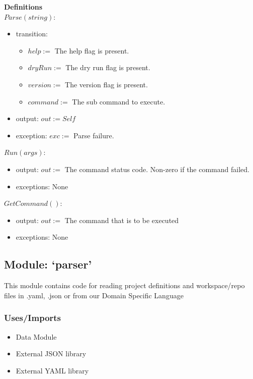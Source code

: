 \documentclass[11pt]{article}
\begin{document}
\vspace{2em}

\textbf{Definitions}\\

$Parse(string):$
\begin{itemize}
\item transition:
  \begin{itemize}
  \item $help :=$ The help flag is present.
  \item $dryRun :=$ The dry run flag is present.
  \item $version :=$ The version flag is present.

  \item $command :=$ The sub command to execute.
  \end{itemize}
\item output: $out := Self$
\item exception: $exc :=$ Parse failure.
\end{itemize}

\vspace{1em}

$Run(args):$
\begin{itemize}
\item output: $out :=$ The command status code. Non-zero if the command failed.
\item exceptions: None
\end{itemize}
\vspace{1em}

$GetCommand():$
\begin{itemize}
\item output: $out :=$ The command that is to be executed
\item exceptions: None
\end{itemize}

\subsection{Module: `parser'}
\label{mod:parser}
This module contains code for reading project definitions and workspace/repo files
in .yaml, .json or from our Domain Specific Language
\subsubsection{Uses/Imports}
\begin{itemize}
  \item Data Module
  \item External JSON library
  \item External YAML library
\end{itemize}
\end{document}
